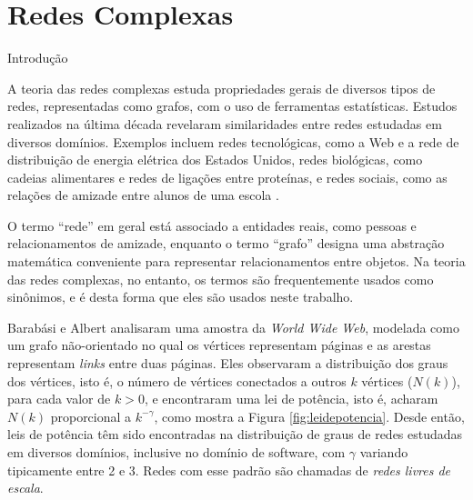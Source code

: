 
\newcommand{\din}[0]{\ensuremath{\delta_{in}}}
\newcommand{\dout}[0]{\ensuremath{\delta_{out}}}
\newcommand{\gin}[0]{\ensuremath{\mathrm{g}_{in}}}
\newcommand{\gout}[0]{\ensuremath{\mathrm{g}_{out}}}

\chapter{Redes Complexas} \label{cap:redes} 

\begin{section}{Introdução} \label{sec:redes-complexas} %


A teoria das redes complexas estuda propriedades gerais de diversos tipos de redes, representadas como grafos, com o uso de ferramentas estatísticas. Estudos realizados na última década revelaram similaridades entre redes estudadas em diversos domínios. Exemplos incluem redes tecnológicas, como a Web e a rede de distribuição de energia elétrica dos Estados Unidos, redes biológicas, como cadeias alimentares e redes de ligações entre proteínas, e redes sociais, como as relações de amizade entre alunos de uma escola \cite{Newman2003}.

O termo ``rede'' em geral está associado a entidades reais, como pessoas e relacionamentos de amizade, enquanto o termo ``grafo'' designa uma abstração matemática conveniente para representar relacionamentos entre objetos. Na teoria das redes complexas, no entanto, os termos são frequentemente usados como sinônimos, e é desta forma que eles são usados neste trabalho.

Barabási e Albert \cite{Barabasi1999} analisaram uma amostra da \emph{World Wide Web}, modelada como um grafo não-orientado no qual os vértices representam páginas e as arestas representam \emph{links} entre duas páginas. Eles observaram a distribuição dos graus dos vértices, isto é, o número de vértices conectados a outros $k$ vértices ($N(k)$), para cada valor de $k > 0$, e encontraram uma lei de potência, isto é, acharam $N(k)$ proporcional a $k^{-\gamma}$, como mostra a Figura \ref{fig:leidepotencia}. Desde então, leis de potência têm sido encontradas na distribuição de graus de redes estudadas em diversos domínios, inclusive no domínio de software, com $\gamma$ variando tipicamente entre 2 e 3. Redes com esse padrão são chamadas de \emph{redes livres de escala}.


\end{section}
